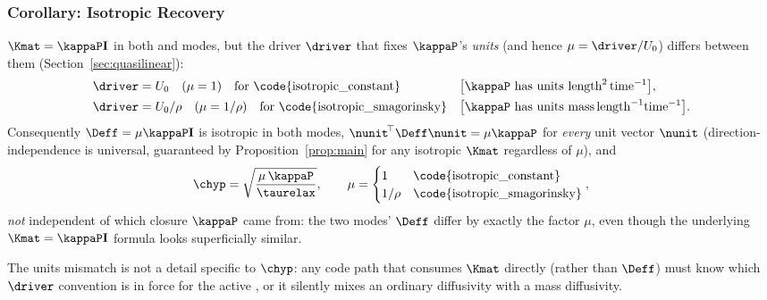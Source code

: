 \subsubsection{Corollary: Isotropic Recovery}
\begin{corollary}
\label{cor:isotropic}
$\Kmat=\kappaP\mathbf I$ in both  and
 modes, but the driver $\driver$ that fixes
$\kappaP$'s \emph{units} (and hence $\mu=\driver/U_0$) differs between
them (Section~\ref{sec:quasilinear}):
\begin{align}
  \driver &= U_0 \quad (\mu=1)\quad \text{for \code{isotropic\_constant}}
  && \big[\kappaP\ \text{has units}\ \text{length}^2\,\text{time}^{-1}\big] , \\
  \driver &= U_0/\rho \quad (\mu=1/\rho)\quad \text{for \code{isotropic\_smagorinsky}}
  && \big[\kappaP\ \text{has units}\ \text{mass}\,\text{length}^{-1}\text{time}^{-1}\big] .
\end{align}
Consequently $\Deff=\mu\kappaP\mathbf I$ is isotropic in both modes,
$\nunit^{\!\top}\Deff\nunit = \mu\kappaP$ for \emph{every} unit vector
$\nunit$ (direction-independence is universal, guaranteed by
Proposition~\ref{prop:main} for any isotropic $\Kmat$ regardless of
$\mu$), and
\begin{equation}
  \chyp = \sqrt{\frac{\mu\,\kappaP}{\taurelax}} ,
  \qquad
  \mu = \begin{cases} 1 & \text{\code{isotropic\_constant}} \\
                       1/\rho & \text{\code{isotropic\_smagorinsky}} \end{cases} ,
\end{equation}
\emph{not} independent of which closure $\kappaP$ came from: the two
modes' $\Deff$ differ by exactly the factor $\mu$, even though the
underlying $\Kmat=\kappaP\mathbf I$ formula looks superficially similar.
\end{corollary}
The units mismatch is not a detail specific to $\chyp$: any code path
that consumes $\Kmat$ directly (rather than $\Deff$) must know which
$\driver$ convention is in force for the active , or
it silently mixes an ordinary diffusivity with a mass diffusivity.

